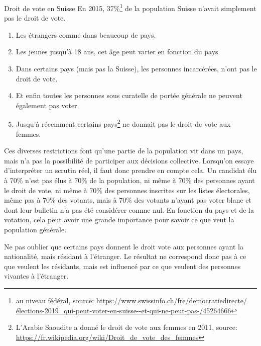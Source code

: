 \documentclass[../report]{subfiles}
\begin{document}
  \begin{nota}{Droit de vote en Suisse}
    En 2015, 37\%\footnote{au niveau fédéral, source: \url{https://www.swissinfo.ch/fre/democratiedirecte/élections-2019\_qui-peut-voter-en-suisse--et-qui-ne-peut-pas-/45264666}}
    de la population Suisse n'avait simplement pas le droit de vote.
    \begin{enumerate}
      \item Les étrangers comme dans beaucoup de pays.
      \item Les jeunes jusqu'à 18 ans, cet âge peut varier en fonction du pays
      \item Dans certains pays (mais pas la Suisse), les personnes incarcérées, n'ont pas 
        le droit de vote.
      \item Et enfin toutes les personnes sous curatelle de portée générale ne peuvent 
        également pas voter.
      \item Jusqu'à récemment certains pays\footnote{L'Arabie Saoudite a donné le droit de vote aux femmes en 2011, source: \url{https://fr.wikipedia.org/wiki/Droit\_de\_vote\_des\_femmes}} ne donnait pas le droit de vote aux femmes.
    \end{enumerate}
  \end{nota}

  Ces diverses restrictions font qu'une partie de la population vit dans un pays, mais n'a
  pas la possibilité de participer aux décisions collective.
  Lorsqu'on essaye d'interpréter un scrutin réel, il faut donc prendre en compte cela.
  Un candidat élu à 70\% n'est pas élus à 70\% de la population, ni même à 70\% des personnes
  ayant le droit de vote, ni même à 70\% des personnes inscrites sur les listes électorales,
  même pas à 70\% des votants, mais à 70\% des votants n'ayant pas voter blanc et dont leur 
  bulletin n'a pas été considérer comme nul.
  En fonction du pays et de la votation, cela peut avoir une grande importance pour savoir ce que
  veut la population générale.

  Ne pas oublier que certains pays donnent le droit vote aux personnes ayant la nationalité, mais 
  résidant à l'étranger.
  Le résultat ne correspond donc pas à ce que veulent les résidants, mais est influencé par ce
  que veulent des personnes vivantes à l'étranger.
\end{document}
